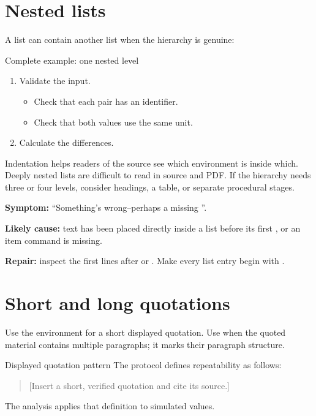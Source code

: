\section{Nested lists}

A list can contain another list when the hierarchy is genuine:

\begin{latexcode}{Complete example: one nested level}
\begin{enumerate}
  \item Validate the input.
    \begin{itemize}
      \item Check that each pair has an identifier.
      \item Check that both values use the same unit.
    \end{itemize}
  \item Calculate the differences.
\end{enumerate}
\end{latexcode}

Indentation helps readers of the source see which environment is inside which.
Deeply nested lists are difficult to read in source and PDF. If the hierarchy
needs three or four levels, consider headings, a table, or separate procedural
stages.

\begin{commonerror}
\textbf{Symptom:} ``Something's wrong--perhaps a missing ''.

\textbf{Likely cause:} text has been placed directly inside a list before its
first , or an item command is missing.

\textbf{Repair:} inspect the first lines after  or
. Make every list entry begin with .
\end{commonerror}

\section{Short and long quotations}

Use the  environment for a short displayed quotation. Use
 when the quoted material contains multiple paragraphs; it
marks their paragraph structure.

\begin{latexcode}{Displayed quotation pattern}
The protocol defines repeatability as follows:
\begin{quote}
  [Insert a short, verified quotation and cite its source.]
\end{quote}
The analysis applies that definition to simulated values.
\end{latexcode}

